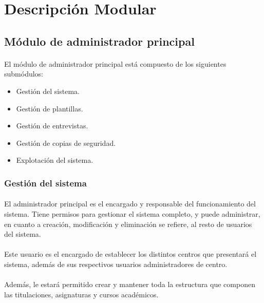 \section{Descripción Modular}\label{descMod}

   \subsection{Módulo de administrador principal}

      \paragraph{}El módulo de administrador principal está compuesto de
      los siguientes submódulos:

      \begin{itemize}
       \item Gestión del sistema.
       \item Gestión de plantillas.
       \item Gestión de entrevistas.
       \item Gestión de copias de seguridad.
       \item Explotación del sistema.
      \end{itemize}

      \subsubsection{Gestión del sistema}

      \paragraph{}El administrador principal es el encargado y responsable
      del funcionamiento del sistema. Tiene permisos para gestionar el
      sistema completo, y puede administrar, en cuanto a creación, modificación
      y eliminación se refiere, al resto de usuarios del sistema.

      \paragraph{}Este usuario es el encargado de establecer los distintos
      centros que presentará el sistema, además de sus respectivos usuarios
      administradores de centro.

      \paragraph{}Además, le estará permitido crear y mantener toda la
      estructura que componen las titulaciones, asignaturas y cursos
      académicos.

